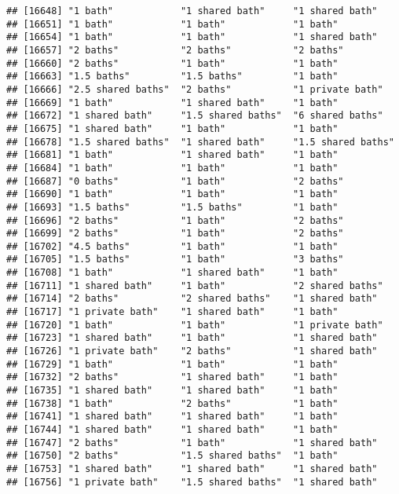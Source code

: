 \documentclass[
]{article}
\begin{document}
\begin{verbatim}
## [16648] "1 bath"            "1 shared bath"     "1 shared bath"    
## [16651] "1 bath"            "1 bath"            "1 bath"           
## [16654] "1 bath"            "1 bath"            "1 shared bath"    
## [16657] "2 baths"           "2 baths"           "2 baths"          
## [16660] "2 baths"           "1 bath"            "1 bath"           
## [16663] "1.5 baths"         "1.5 baths"         "1 bath"           
## [16666] "2.5 shared baths"  "2 baths"           "1 private bath"   
## [16669] "1 bath"            "1 shared bath"     "1 bath"           
## [16672] "1 shared bath"     "1.5 shared baths"  "6 shared baths"   
## [16675] "1 shared bath"     "1 bath"            "1 bath"           
## [16678] "1.5 shared baths"  "1 shared bath"     "1.5 shared baths" 
## [16681] "1 bath"            "1 shared bath"     "1 bath"           
## [16684] "1 bath"            "1 bath"            "1 bath"           
## [16687] "0 baths"           "1 bath"            "2 baths"          
## [16690] "1 bath"            "1 bath"            "1 bath"           
## [16693] "1.5 baths"         "1.5 baths"         "1 bath"           
## [16696] "2 baths"           "1 bath"            "2 baths"          
## [16699] "2 baths"           "1 bath"            "2 baths"          
## [16702] "4.5 baths"         "1 bath"            "1 bath"           
## [16705] "1.5 baths"         "1 bath"            "3 baths"          
## [16708] "1 bath"            "1 shared bath"     "1 bath"           
## [16711] "1 shared bath"     "1 bath"            "2 shared baths"   
## [16714] "2 baths"           "2 shared baths"    "1 shared bath"    
## [16717] "1 private bath"    "1 shared bath"     "1 bath"           
## [16720] "1 bath"            "1 bath"            "1 private bath"   
## [16723] "1 shared bath"     "1 bath"            "1 shared bath"    
## [16726] "1 private bath"    "2 baths"           "1 shared bath"    
## [16729] "1 bath"            "1 bath"            "1 bath"           
## [16732] "2 baths"           "1 shared bath"     "1 bath"           
## [16735] "1 shared bath"     "1 shared bath"     "1 bath"           
## [16738] "1 bath"            "2 baths"           "1 bath"           
## [16741] "1 shared bath"     "1 shared bath"     "1 bath"           
## [16744] "1 shared bath"     "1 shared bath"     "1 bath"           
## [16747] "2 baths"           "1 bath"            "1 shared bath"    
## [16750] "2 baths"           "1.5 shared baths"  "1 bath"           
## [16753] "1 shared bath"     "1 shared bath"     "1 shared bath"    
## [16756] "1 private bath"    "1.5 shared baths"  "1 shared bath"    

\end{verbatim}
\end{document}
